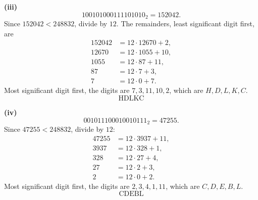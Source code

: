 \documentclass[11pt]{article}
\begin{document}
\textbf{(iii)}
\[
100101000111101010_{2}=152042.
\]
Since $152042<248832$, divide by $12$. The remainders, least significant digit first, are
\begin{align*}
152042&=12\cdot 12670+2,\\
12670&=12\cdot 1055+10,\\
1055&=12\cdot 87+11,\\
87&=12\cdot 7+3,\\
7&=12\cdot 0+7.
\end{align*}
Most significant digit first, the digits are $7,3,11,10,2$, which are $H,D,L,K,C$.
\[
\boxed{\text{HDLKC}}
\]

\textbf{(iv)}
\[
001011100010010111_{2}=47255.
\]
Since $47255<248832$, divide by $12$:
\begin{align*}
47255&=12\cdot 3937+11,\\
3937&=12\cdot 328+1,\\
328&=12\cdot 27+4,\\
27&=12\cdot 2+3,\\
2&=12\cdot 0+2.
\end{align*}
Most significant digit first, the digits are $2,3,4,1,11$, which are $C,D,E,B,L$.
\[
\boxed{\text{CDEBL}}
\]
\end{document}
